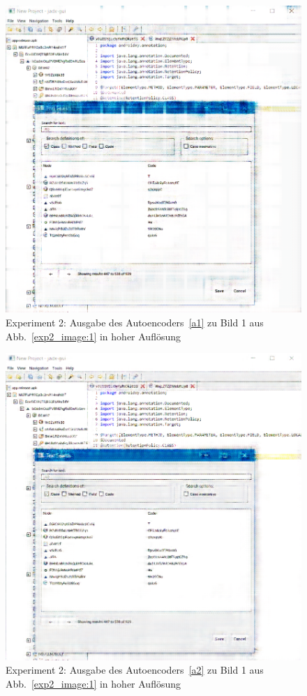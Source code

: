 \begin{figure} [ht]
  \centering
  \includegraphics[width=\textwidth]{bilder/result_exp2/0_pred_a1.png}

  \caption{Experiment 2: Ausgabe des Autoencoders~\ref{a1} zu Bild 1 aus Abb.~\ref{exp2_image:1} in hoher Auflösung}
\end{figure}

\begin{figure} [ht]
  \centering
  \includegraphics[width=\textwidth]{bilder/result_exp2/0_pred_a2.png}

  \caption{Experiment 2: Ausgabe des Autoencoders~\ref{a2} zu Bild 1 aus Abb.~\ref{exp2_image:1} in hoher Auflösung}
\end{figure}

